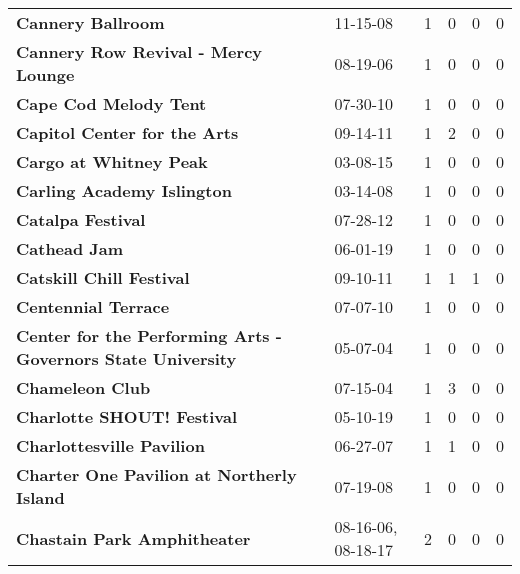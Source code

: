 \begin{supertabular}{llllll}
                                            \textbf{Cannery Ballroom} &                      11-15-08 &  1 &   0 &  0 &  0 \\
                          \textbf{Cannery Row Revival - Mercy Lounge} &                      08-19-06 &  1 &   0 &  0 &  0 \\
                                        \textbf{Cape Cod Melody Tent} &                      07-30-10 &  1 &   0 &  0 &  0 \\
                                 \textbf{Capitol Center for the Arts} &                      09-14-11 &  1 &   2 &  0 &  0 \\
                                       \textbf{Cargo at Whitney Peak} &                      03-08-15 &  1 &   0 &  0 &  0 \\
                                   \textbf{Carling Academy Islington} &                      03-14-08 &  1 &   0 &  0 &  0 \\
                                            \textbf{Catalpa Festival} &                      07-28-12 &  1 &   0 &  0 &  0 \\
                                                 \textbf{Cathead Jam} &                      06-01-19 &  1 &   0 &  0 &  0 \\
                                     \textbf{Catskill Chill Festival} &                      09-10-11 &  1 &   1 &  1 &  0 \\
                                          \textbf{Centennial Terrace} &                      07-07-10 &  1 &   0 &  0 &  0 \\
 \textbf{Center for the Performing Arts - Governors State University} &                      05-07-04 &  1 &   0 &  0 &  0 \\
                                              \textbf{Chameleon Club} &                      07-15-04 &  1 &   3 &  0 &  0 \\
                                   \textbf{Charlotte SHOUT! Festival} &                      05-10-19 &  1 &   0 &  0 &  0 \\
                                    \textbf{Charlottesville Pavilion} &                      06-27-07 &  1 &   1 &  0 &  0 \\
                    \textbf{Charter One Pavilion at Northerly Island} &                      07-19-08 &  1 &   0 &  0 &  0 \\
                                  \textbf{Chastain Park Amphitheater} &            08-16-06, 08-18-17 &  2 &   0 &  0 &  0 \\

\end{supertabular}
